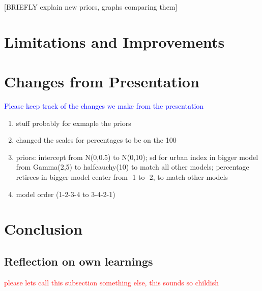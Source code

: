 \documentclass[12pt]{article}
\newcommand{\blue}[1]{\textcolor{blue}{#1}}
\begin{document}
[BRIEFLY explain new priors, graphs comparing them]



\section{Limitations and Improvements}


\section{Changes from Presentation}
\blue{Please keep track of the changes we make from the presentation}
\begin{enumerate}
	\item stuff probably for exmaple the priors 
	\item changed the scales for percentages to be on the 100
	\item priors: intercept from N(0,0.5) to N(0,10); sd for urban index in bigger model from Gamma(2,5) to halfcauchy(10) to match all other models; percentage retirees in bigger model center from -1 to -2, to match other models
	\item model order (1-2-3-4 to 3-4-2-1) 
\end{enumerate}

\section{Conclusion}

\subsection{Reflection on own learnings}

\textcolor{red}{please lets call this subsection something else, this sounds so childish}


\printbibliography
\end{document}

